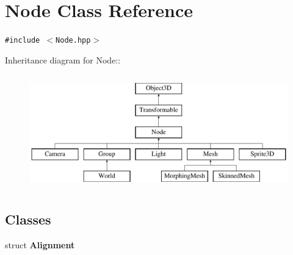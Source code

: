 \hypertarget{classm3g_1_1Node}{
\section{Node Class Reference}
\label{classm3g_1_1Node}
}
{\tt \#include $<$Node.hpp$>$}

Inheritance diagram for Node::\begin{figure}[H]
\begin{center}
\leavevmode
\includegraphics[height=5cm]{classm3g_1_1Node}
\end{center}
\end{figure}
\subsection*{Classes}
\begin{CompactItemize}
\item 
struct \textbf{Alignment}
\end{CompactItemize}
